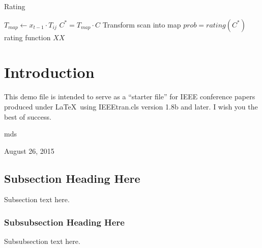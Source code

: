 \documentclass[conference]{IEEEtran}
\begin{document}
\begin{algorithm}
	\caption{Rating}
	\label{alg:rating}
	\begin{algorithmic}[1]
		\State $T_{map} \gets x_{t-1} \cdot T_{ij}$
		\State $C^* = T_{map} \cdot C $ \Comment Transform scan into map
		\State $prob = rating(C^*)$ \Comment rating function
		\State \Return $XX$
		\EndFunction
	\end{algorithmic}
\end{algorithm}

\section{Introduction}
This demo file is intended to serve as a ``starter file''
for IEEE conference papers produced under \LaTeX\ using
IEEEtran.cls version 1.8b and later.
I wish you the best of success.

\hfill mds
 
\hfill August 26, 2015

\subsection{Subsection Heading Here}
Subsection text here.


\subsubsection{Subsubsection Heading Here}
Subsubsection text here.


%
%
\end{document}
